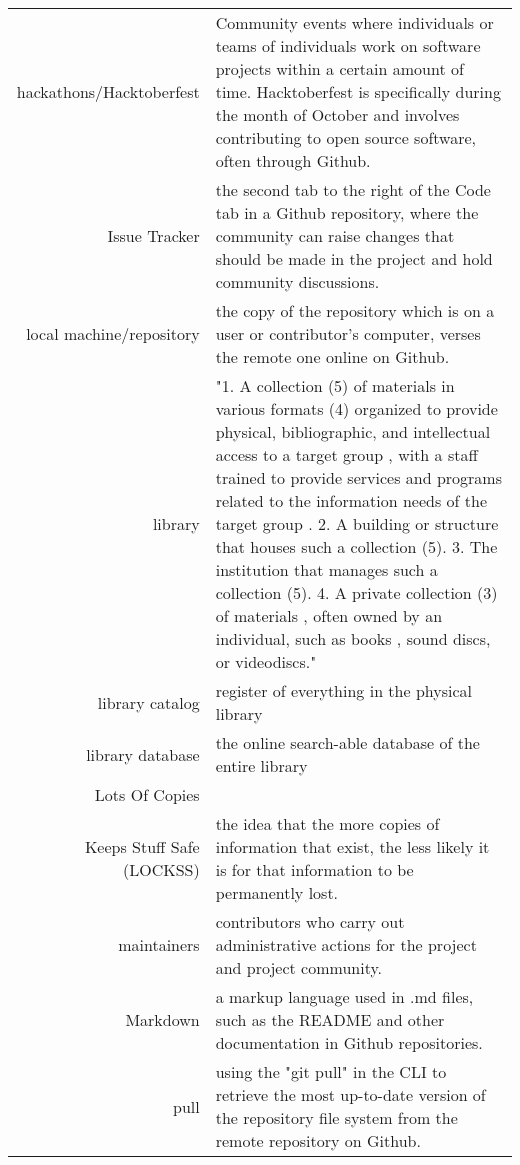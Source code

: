 \begin{center}
\begin{longtable}{r p{}}
hackathons/Hacktoberfest & Community events where individuals or teams of individuals work on software projects within a certain amount of time. Hacktoberfest is specifically during the month of October and involves contributing to open source software, often through Github. \\


Issue Tracker & the second tab to the right of the Code tab in a Github repository, where the community can raise changes that should be made in the project and hold community discussions. \\

local machine/repository & the copy of the repository which is on a user or contributor's computer, verses the remote one online on Github. \\

library & "1. A collection (5) of materials in various formats (4) organized to provide physical, bibliographic, and intellectual access to a target group , with a staff trained to provide services and programs related to the information needs of the target group . 2. A building or structure that houses such a collection (5). 3. The institution that manages such a collection (5). 4. A private collection (3) of materials , often owned by an individual, such as books , sound discs, or videodiscs." \cite{glossary2013} \\

library catalog & register of everything in the physical library \\

library database & the online search-able database of the entire library \\

Lots Of Copies\\Keeps Stuff Safe (LOCKSS) & the idea that the more copies of information that exist, the less likely it is for that information to be permanently lost. \\

maintainers & contributors who carry out administrative actions for the project and project community. \\

Markdown & a markup language used in .md files, such as the README and other documentation in Github repositories.\\

pull & using the "git pull" \cite{gitdocs} in the CLI to retrieve the most up-to-date version of the repository file system from the remote repository on Github. \\


\end{longtable}
\end{center}
